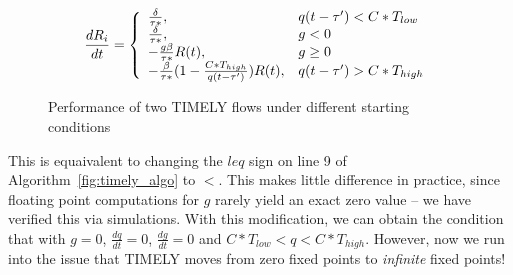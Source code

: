 \begin{equation}
\frac{{dR_i}}{{dt}} = \left\{ \begin{array}{ll}
\frac{\delta }{{\tau *}}, & q(t - \tau ') < C*{T_{low}}\\
\frac{\delta }{{\tau *}}, & g < 0\\
 - \frac{{g\beta }}{{\tau *}}R(t), & g \ge 0\\
 - \frac{\beta }{{\tau *}}(1 - \frac{{C*{T_{high}}}}{{q(t - \tau ')}})R(t), & q(t - \tau ') > C*{T_{high}}
\end{array} \right.\\
\label{eq:timely_r_modified}
\end{equation}

\begin{figure}[t]
\center
{}
\caption{Performance of two TIMELY flows under different starting conditions}
\label{fig:timely_unstable}
\end{figure}

This is equaivalent to changing the $leq$ sign on line 9 of
Algorithm~\ref{fig:timely_algo} to $<$. This makes little difference in
practice, since floating point computations for $g$ rarely yield an exact zero
value -- we have verified this via simulations. With this modification, we can
obtain the condition that with $g =0$, $\tfrac{dq}{dt} = 0$, $\tfrac{dg}{dt} =
0$ and $C*T_{low} < q < C*T_{high}$. However, now we run into the issue that
TIMELY moves from zero fixed points to \emph{infinite} fixed points!

